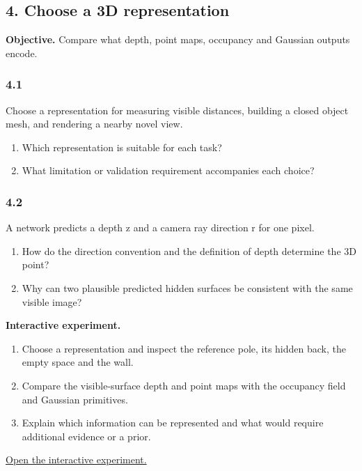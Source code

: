 \documentclass[11pt,a4paper]{article}
\begin{document}
\subsection*{4. Choose a 3D representation}
\noindent\textbf{Objective.} Compare what depth, point maps, occupancy and Gaussian outputs encode.
\par
\noindent
\begin{minipage}{\linewidth}
\subsubsection*{4.1}
Choose a representation for measuring visible distances, building a closed object mesh, and rendering a nearby novel view.
\begin{enumerate}[label=(\alph*),nosep]
\item Which representation is suitable for each task?
\item What limitation or validation requirement accompanies each choice?
\end{enumerate}
\end{minipage}
\par\medskip
\par
\noindent
\begin{minipage}{\linewidth}
\subsubsection*{4.2}
A network predicts a depth z and a camera ray direction r for one pixel.
\begin{enumerate}[label=(\alph*),nosep]
\item How do the direction convention and the definition of depth determine the 3D point?
\item Why can two plausible predicted hidden surfaces be consistent with the same visible image?
\end{enumerate}
\end{minipage}
\par\medskip
\noindent\textbf{Interactive experiment.}
\begin{enumerate}[nosep]
\item Choose a representation and inspect the reference pole, its hidden back, the empty space and the wall.
\item Compare the visible-surface depth and point maps with the occupancy field and Gaussian primitives.
\item Explain which information can be represented and what would require additional evidence or a prior.
\end{enumerate}
\noindent\href{https://sosekie.github.io/Unibe-CVG-CV-Interactive-Labs/tutorial-10/#representations}{Open the interactive experiment.}
\end{document}

